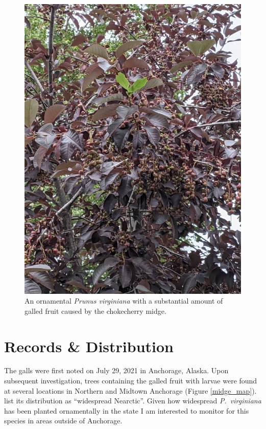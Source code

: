 \begin{figure}[H]
\begin{center}
\vspace{2mm}
\includegraphics[width=\textwidth]{img/midge_tree.jpg}
\caption{An ornamental \textit{Prunus virginiana} with a substantial amount of galled fruit caused by the chokecherry midge.}
\label{midge_tree}
\end{center}
\end{figure}



 
\section{Records \& Distribution} The galls were first noted on July 29, 2021 in Anchorage, Alaska. Upon subsequent investigation, trees containing the galled fruit with larvae were found at several locations in Northern and Midtown Anchorage (Figure \ref{midge_map}). \citet{GagneJaschhof2021} list its distribution as ``widespread Nearctic''. Given how widespread \textit{P.\ virginiana} has been planted ornamentally in the state I am interested to monitor for this species in areas outside of Anchorage. 

